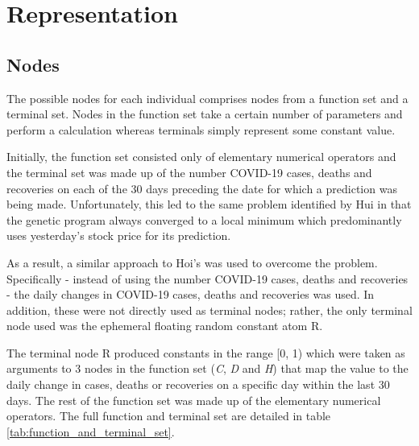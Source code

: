 \section{Representation}

\subsection{Nodes}
The possible nodes for each individual comprises nodes from a function set and a terminal set. Nodes in the function set take a certain number of parameters and perform a calculation whereas terminals simply represent some constant value.

Initially, the function set consisted only of elementary numerical operators and the terminal set was made up of the number COVID-19 cases, deaths and recoveries on each of the 30 days preceding the date for which a prediction was being made. Unfortunately, this led to the same problem identified by Hui \cite{hui2003using} in that the genetic program always converged to a local minimum which predominantly uses yesterday’s stock price for its prediction.

As a result, a similar approach to Hoi's \cite{hui2003using} was used to overcome the problem. Specifically - instead of using the number COVID-19 cases, deaths and recoveries - the daily changes in COVID-19 cases, deaths and recoveries was used. In addition, these were not directly used as terminal nodes; rather, the only terminal node used was the ephemeral floating random constant atom R. 

The terminal node R produced constants in the range [0, 1) which were taken as arguments to 3 nodes in the function set (\emph{C}, \emph{D} and \emph{H}) that  map the value to the daily change in cases, deaths or recoveries on a specific day within the last 30 days. The rest of the function set was made up of the elementary numerical operators. The full function and terminal set are detailed in table \ref{tab:function_and_terminal_set}.

